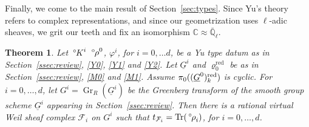 \documentclass[10pt]{amsart}
\theoremstyle{plain}
\newtheorem{theorem}{Theorem}[section]
\theoremstyle{definition}
\newcommand{\CC}{{\mathbb{C}}}
\newcommand{\EE}{\mathbb{\bar Q}_\ell}
\newcommand{\Fq}{k}
\DeclareMathOperator{\Gr}{Gr}
\DeclareMathOperator{\trace}{Tr}
\newcommand{\trFrob}[1]{t_{#1}}
\newcommand{\cs}[1]{{\mathcal{#1}}}
\newcommand{\red}{^{\operatorname{red}}}
\newcommand{\oK}{{\,^\circ \hskip-1pt K}}
\newcommand{\orho}{{\,^\circ \hskip-1pt \rho}}
\begin{document}
Finally, we come to the main result of Section~\ref{sec:types}.
%
Since Yu's theory refers to complex representations, and since our geometrization uses $\ell$-adic sheaves, we grit our teeth and fix an isomorphism $\CC \approx \EE$.

\begin{theorem}\label{thm:geotypes}
Let $\oK^i$ $\orho^0$, $\varphi^i$, for $i=0, \ldots d$, be a Yu type datum as in Section~\ref{ssec:review}, \ref{Y0}, \ref{Y1} and \ref{Y2}.
Let $\underline{G}^i$ and $\varrho_0\red$ be as in Section~\ref{ssec:review}, \ref{M0} and \ref{M1}.
Assume $\pi_0((\underline{G}^0)_\Fq^\reductive)$ is cyclic.
For $i=0, \ldots ,d$, let $G^i = \Gr_{R}(\underline{G}^i)$ be the Greenberg transform of the smooth group scheme $\underline{G}^i$ appearing in Section~\ref{ssec:review}.
Then there is a rational virtual Weil sheaf complex $\cs{F}_i$ on $G^i$ such that $\trFrob{\cs{F}_i} = \trace(\orho_i)$, for $i=0, \ldots , d$.
\end{theorem}
\end{document}
